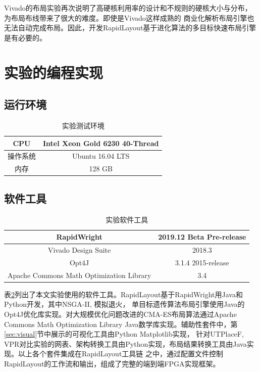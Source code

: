 Vivado的布局实验再次说明了高硬核利用率的设计和不规则的硬核大小与分布，为布局布线带来了很大的难度。即使是Vivado这样成熟的
商业化解析布局引擎也无法自动完成布局。因此，开发RapidLayout基于进化算法的多目标快速布局引擎是有必要的。




\section{实验的编程实现}


\subsection{运行环境}
\begin{table}[h]
	\centering
	\caption{实验测试环境}		
	\label{tab1}
	\begin{tabular}{c|c}
		\toprule[2pt]
        CPU & Intel Xeon Gold 6230 40-Thread\\
        \hline
		操作系统 & Ubuntu 16.04 LTS \\
		\hline                                        
		内存 	& 128 GB	\\
		\bottomrule[2pt]
	\end{tabular}
\end{table}

\subsection{软件工具}

\begin{table}[h]
	\centering
	\caption{实验软件工具}		
	\label{tab2}
	\begin{tabular}{c|c}
		\toprule[2pt]
		RapidWright 	& 2019.12 Beta Pre-release	\\
        \hline                                         
        Vivado Design Suite	&  2018.3 \\
        \hline
        Opt4J  &  3.1.4 2015-release \\
        \hline
        Apache Commons Math Optimization Library & 3.4 \\
        \bottomrule[2pt]
	\end{tabular}
\end{table}

表\ref{tab2}列出了本文实验使用的软件工具。RapidLayout基于RapidWright用Java和Python开发，其中NSGA-II, 模拟退火，
单目标遗传算法布局引擎使用Java的Opt4J优化库实现。对大规模优化问题改进的CMA-ES布局算法通过Apache Commons 
Math Optimization Library Java数学库实现。辅助性套件中，第\ref{sec:visual}节中展示的可视化工具由Python Matplotlib实现，
针对UTPlaceF, VPR对比实验的网表、架构转换工具由Python实现，布局结果转换工具由Java实现。以上各个套件集成在RapidLayout工具链
之中，通过配置文件控制RapidLayout的工作流和输出，组成了完整的端到端FPGA实现框架。


